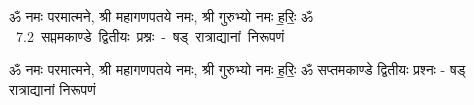 \documentclass[17pt]{extarticle}
\begin{document}
\begin{titlepage}
    \begin{center}
 
\begin{sanskrit}
    { \Large
    ॐ नमः परमात्मने, श्री महागणपतये नमः, श्री गुरुभ्यो नमः
ह॒रिः॒ ॐ 
    }
    \\
    \vspace{2.5cm}
    \mbox{ \Huge
    7.2      सप्तमकाण्डे द्वितीयः प्रश्नः - षड् रात्राद्यानां निरूपणं   }
\end{sanskrit}
\end{center}

\end{titlepage}
\tableofcontents

ॐ नमः परमात्मने, श्री महागणपतये नमः, श्री गुरुभ्यो नमः
ह॒रिः॒ ॐ       सप्तमकाण्डे द्वितीयः प्रश्नः - षड् रात्राद्यानां निरूपणं \newline

\end{document}
